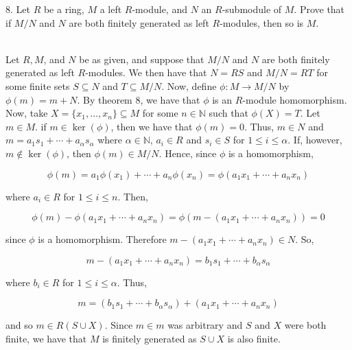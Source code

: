 8. Let $R$ be a ring, $M$ a left $R$-module, and $N$ an $R$-submodule of $M$. Prove that if $M/N$ and
$N$ are both finitely generated as left $R$-modules, then so is $M$.

\begin{solution}\renewcommand{\qedsymbol}{}\ \\
    Let $R, M$, and $N$ be as given, and suppose that $M/N$ and $N$ are both finitely generated as left
    $R$-modules. We then have that $N=RS$ and $M/N=RT$ for some finite sets $S\subseteq N$ and
    $T\subseteq M/N$. Now, define $\phi:M\rightarrow M/N$ by $\phi(m)=m+N$. By theorem 8, we have that
    $\phi$ is an $R$-module homomorphism. Now, take $X=\{x_1,\ldots, x_n\}\subseteq M$ for some
    $n\in\mathbb{N}$ such that $\phi(X)=T$. Let $m\in M$. if $m\in\ker(\phi)$, then we have that
    $\phi(m)=0$. Thus, $m\in N$ and $m=a_1s_1+\cdots+a_{\alpha}s_{\alpha}$ where $\alpha\in\mathbb{N}$,
    $a_i\in R$ and $s_i\in S$ for $1\leq i\leq\alpha$. If, however, $m\notin\ker(\phi)$, then
    $\phi(m)\in M/N$. Hence, since $\phi$ is a homomorphism,
    
    $$\phi(m)=a_1\phi(x_1)+\cdots+a_n\phi(x_n)=\phi(a_1x_1+\cdots+a_nx_n)$$
    
    where $a_i\in R$ for $1\leq i\leq n$. Then,
    
    $$\phi(m)-\phi(a_1x_1+\cdots+a_nx_n)=\phi(m-(a_1x_1+\cdots+a_nx_n))=0$$
    
    since $\phi$ is a homomorphism. Therefore $m-(a_1x_1+\cdots+a_nx_n)\in N$. So,
    
    $$m-(a_1x_1+\cdots+a_nx_n)=b_1s_1+\cdots+b_{\alpha}s_{\alpha}$$
    
    where $b_i\in R$ for $1\leq i\leq\alpha$. Thus,
    
    $$m=(b_1s_1+\cdots+b_{\alpha}s_{\alpha})+(a_1x_1+\cdots+a_nx_n)$$
    
    and so $m\in R(S\cup X)$. Since $m\in m$ was arbitrary and $S$ and $X$ were both finite, we have
    that $M$ is finitely generated as $S\cup X$ is also finite.

\end{solution}